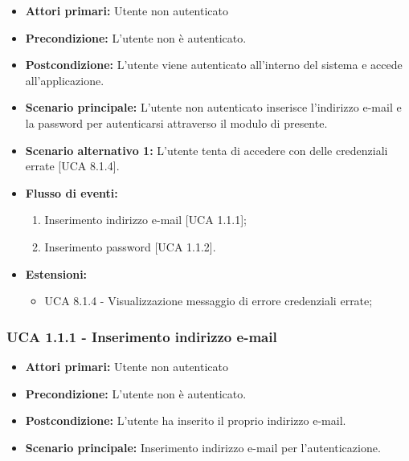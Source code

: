 \begin{itemize}
\item \textbf{Attori primari:} Utente non autenticato
\item \textbf{Precondizione:} L'utente non è autenticato.
\item \textbf{Postcondizione:} L'utente viene autenticato all'interno del sistema e accede all'applicazione.
\item \textbf{Scenario principale:} L'utente non autenticato inserisce l'indirizzo e-mail e la password per autenticarsi attraverso il modulo di  presente.
\item \textbf{Scenario alternativo 1:} L'utente tenta di accedere con delle credenziali errate [UCA 8.1.4].
\item \textbf{Flusso di eventi:}
  \begin{enumerate}
        \item Inserimento indirizzo e-mail [UCA 1.1.1];
        \item Inserimento password [UCA 1.1.2].
    \end{enumerate}
\item \textbf{Estensioni:}
	\begin{itemize}
		\item UCA 8.1.4 - Visualizzazione messaggio di errore credenziali errate;
	\end{itemize}
\end{itemize}

\subsubsection{UCA 1.1.1 - Inserimento indirizzo e-mail}%
\begin{itemize}
\item \textbf{Attori primari:} Utente non autenticato
\item \textbf{Precondizione:} L'utente non è autenticato.
\item \textbf{Postcondizione:} L'utente ha inserito il proprio indirizzo e-mail.
\item \textbf{Scenario principale:} Inserimento indirizzo e-mail per l'autenticazione.
\end{itemize}

